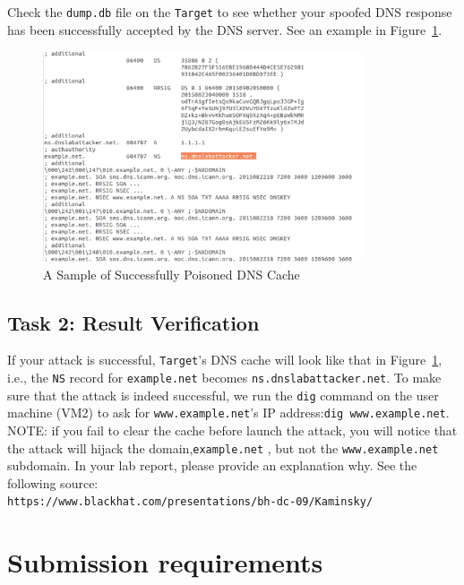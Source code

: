 Check the {\tt dump.db} file on the {\tt Target} to see whether your spoofed DNS
response has been successfully accepted by the DNS server. 
See an example in Figure~\ref{fig:cache_screenshot}.

\begin{figure}[!htb]
\centering
\includegraphics*[width=0.85\textwidth]{cache_screen.png}
\caption{A Sample of Successfully Poisoned DNS Cache}
\label{fig:cache_screenshot}
\end{figure}


\subsection{Task 2: Result Verification}


If your attack is successful, {\tt Target}'s DNS cache will look like 
that in Figure~\ref{fig:cache_screenshot}, i.e., the {\tt NS} record 
for {\tt example.net} becomes {\tt ns.dnslabattacker.net}. To make sure
that the attack is indeed successful, we run the {\tt dig} command 
on the user machine (VM2) to ask for {\tt www.example.net}'s IP address:{\tt dig www.example.net}. NOTE: if you fail to clear the cache before launch the attack, you will notice that the attack will hijack the domain,{\tt example.net} , but not the {\tt www.example.net} subdomain.  In your lab report, please provide an explanation why.  See the following source: \\
{\tt https://www.blackhat.com/presentations/bh-dc-09/Kaminsky/} \\

\section{Submission requirements}
